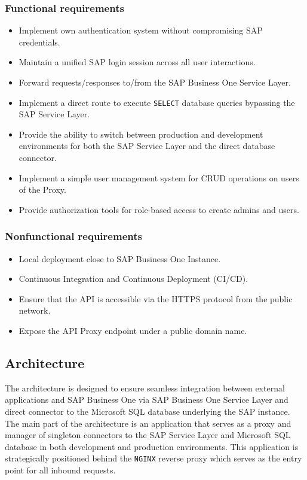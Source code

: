 \subsubsection{Functional requirements}
\label{subsubs:functional-requirements}
\begin{itemize}
    \item Implement own authentication system without compromising SAP credentials.
    \item Maintain a unified SAP login session across all user interactions.
    \item Forward requests/responses to/from the SAP Business One Service Layer.
    \item Implement a direct route to execute \texttt{SELECT} database queries bypassing the SAP Service Layer.
    \item Provide the ability to switch between production and development environments for both the SAP Service Layer and the direct database connector.
    \item Implement a simple user management system for CRUD operations on users of the Proxy.
    \item Provide authorization tools for role-based access to create admins and users.
\end{itemize}

\subsubsection{Nonfunctional requirements}
\label{subsubsec:nonfunctional-requirements}
\begin{itemize}
    \item Local deployment close to SAP Business One Instance.
    \item Continuous Integration and Continuous Deployment (\ac{CI}/\ac{CD}).
    \item Ensure that the API is accessible via the HTTPS protocol from the public network.
    \item Expose the API Proxy endpoint under a public domain name.
\end{itemize}

\subsection{Architecture}
\label{subsec:architecture}
The architecture is designed to ensure seamless integration between external applications and SAP Business One via SAP Business One Service Layer and direct connector to the Microsoft SQL database underlying the SAP instance. 
The main part of the architecture is an application that serves as a proxy and manager of singleton connectors to the SAP Service Layer and Microsoft SQL database in both development and production environments.
This application is strategically positioned behind the \texttt{NGINX} reverse proxy which serves as the entry point for all inbound requests.


